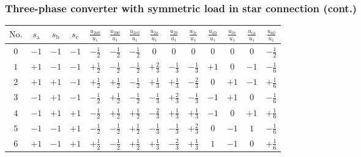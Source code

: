 \begin{frame}[b]
    \frametitle{Three-phase converter with symmetric load in star connection (cont.)}
    \vspace{1em}
    \begin{table}
        \renewcommand{\arraystretch}{1.25}
        \centering
        \begin{tabular}{c c c c c c c c c c c c c c}
            \toprule
            $\mathrm{No.}$ & $s_\mathrm{a}$ & $s_\mathrm{b}$ & $s_\mathrm{c}$ & $\frac{u_{2a0}}{u_1}$ & $\frac{u_{2b0}}{u_1}$ & $\frac{u_{2c0}}{u_1}$ & $\frac{u_{2a}}{u_1}$ & $\frac{u_{2b}}{u_1}$ & $\frac{u_{2c}}{u_1}$ & $\frac{u_{\mathrm{ab}}}{u_1}$ & $\frac{u_{\mathrm{bc}}}{u_1}$ & $\frac{u_{\mathrm{ca}}}{u_1}$ & $\frac{u_{\mathrm{n}0}}{u_1}$ \\
            \midrule
            $0$ & $-1$ & $-1$ & $-1$ & $-\frac{1}{2}$ & $-\frac{1}{2}$ & $-\frac{1}{2}$ & $0$ & $0$ & $0$ & $0$& $0$& $0$&$-\frac{1}{2}$\\

            $1$ & $+1$ & $-1$ & $-1$ & $+\frac{1}{2}$ & $-\frac{1}{2}$ & $-\frac{1}{2}$ & $+\frac{2}{3}$ & $-\frac{1}{3}$ & $-\frac{1}{3}$ & $+1$& $0$& $-1$& $-\frac{1}{6}$\\

            $2$ & $+1$ & $+1$ & $-1$ & $+\frac{1}{2}$ & $+\frac{1}{2}$ & $-\frac{1}{2}$ & $+\frac{1}{3}$ & $+\frac{1}{3}$ & $-\frac{2}{3}$ & $0$& $+1$& $-1$& $+\frac{1}{6}$\\

            $3$ & $-1$ & $+1$ & $-1$ & $-\frac{1}{2}$ & $+\frac{1}{2}$ & $-\frac{1}{2}$ & $-\frac{1}{3}$ & $+\frac{2}{3}$ & $-\frac{1}{3}$ & $-1$& $+1$& $0$& $-\frac{1}{6}$\\

            $4$ & $-1$ & $+1$ & $+1$ & $-\frac{1}{2}$ & $+\frac{1}{2}$ & $+\frac{1}{2}$ & $-\frac{2}{3}$ & $+\frac{1}{3}$ & $+\frac{1}{3}$ & $-1$& $0$& $+1$& $+\frac{1}{6}$\\

            $5$ & $-1$ & $-1$ & $+1$ & $-\frac{1}{2}$ & $-\frac{1}{2}$ & $+\frac{1}{2}$ & $-\frac{1}{3}$ & $-\frac{1}{3}$ & $+\frac{2}{3}$ & $0$& $-1$& $1$& $-\frac{1}{6}$\\

            $6$ & $+1$ & $-1$ & $+1$ & $+\frac{1}{2}$ & $-\frac{1}{2}$ & $+\frac{1}{2}$ & $+\frac{1}{3}$ & $-\frac{2}{3}$ & $+\frac{1}{3}$ & $1$& $-1$& $0$& $+\frac{1}{6}$\\


\end{tabular}
\end{table}
\end{frame}
